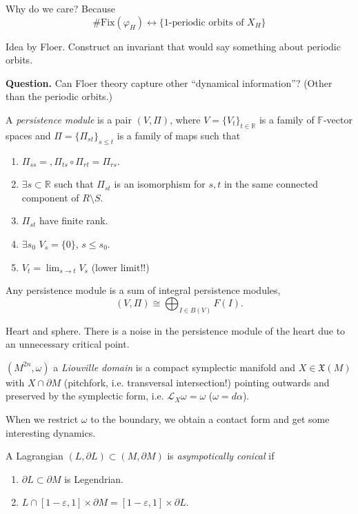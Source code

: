 Why do we care? Because
$$
\#
\text{Fix}(\varphi_H)
\leftrightarrow\{\text{1-periodic
orbits of $X_H$}\}
$$

Idea by Floer. Construct an invariant that
would
say something about periodic orbits.

\medskip\noindent
{\bf Question.} Can Floer theory capture
other ``dynamical information''?
(Other than the periodic orbits.)

\medskip\noindent
A {\it persistence module} is a pair
$(V,\Pi)$, where $V=\{V_t\}_{t \in
\mathbb{R}}$ is a family of
$\mathbb{F}$-vector spaces
and $\Pi=\{\Pi_{st}\}_{s \leq  t}$ is a
family of maps such that
\begin{enumerate}
\item $\Pi_{ss}=, \Pi_{ts}\circ
\Pi_{rt}=\Pi_{rs}$.
\item $\exists  s \subset \mathbb{R}$ such
that
$\Pi_{s t}$ is an isomorphism for $s,t$ in
the same connected component of
$R\setminus S$.
\item $\Pi_{s t}$ have finite rank.
\item $\exists s_0$ $V_s=\{0\}$, $s \leq
s_0$.
\item $V_t= \lim_{s \to t} V_s$ (lower
limit!!)
\end{enumerate}

\begin{theorem}
\label{theorem-persi-modul-sum-integ}
Any persistence module is a sum of integral
persistence modules,
$$
(V,\Pi) \cong \bigoplus_{I \in B(V)}F(I).
$$
\end{theorem}

\begin{example}
\label{example-hart-and-sphere}
Heart and sphere. There is a noise in the
persistence module
of the heart due to an unnecessary critical
point.
\end{example}

$(M^{2n},\omega)$ a {\it Liouville domain} is
a compact
symplectic manifold and $X \in
\mathfrak{X}(M)$
with $X \cap\partial M$ (pitchfork, i.e.
transversal intersection!)
pointing outwards
and preserved by the symplectic form, i.e.
$\mathcal{L}_X \omega=\omega$
($\omega=d \alpha$).

When we restrict $\omega$ to the boundary,
we obtain a contact form and get some
interesting dynamics.

A Lagrangian $(L,\partial L) \subset
(M,\partial M)$
is {\it asympotically conical} if
\begin{enumerate}
\item $\partial L \subset \partial M$ is
Legendrian.
\item $L \cap [1-\varepsilon,1] \times
\partial M=
[1-\varepsilon,1] \times \partial L$.
\end{enumerate}

